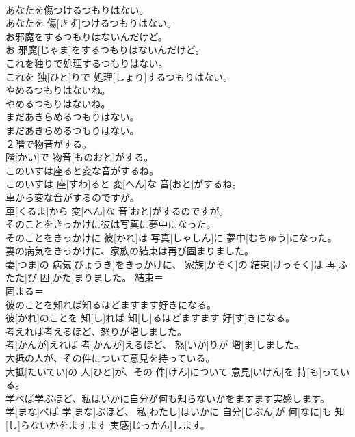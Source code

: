 \documentclass[8pt]{extreport}
\begin{document}
\begin{CJK}{UTF8}{min}
\\	あなたを傷つけるつもりはない。	
\\	あなたを 傷[きず]つけるつもりはない。	
\\	お邪魔をするつもりはないんだけど。	
\\	お 邪魔[じゃま]をするつもりはないんだけど。	
\\	これを独りで処理するつもりはない。	
\\	これを 独[ひと]りで 処理[しょり]するつもりはない。	
\\	やめるつもりはないね。	
\\	やめるつもりはないね。	
\\	まだあきらめるつもりはない。	
\\	まだあきらめるつもりはない。	
\\	２階で物音がする。	
\\	階[かい]で 物音[ものおと]がする。	
\\	このいすは座ると変な音がするね。	
\\	このいすは 座[すわ]ると 変[へん]な 音[おと]がするね。	
\\	車から変な音がするのですが。	
\\	車[くるま]から 変[へん]な 音[おと]がするのですが。	
\\	そのことをきっかけに彼は写真に夢中になった。	
\\	そのことをきっかけに 彼[かれ]は 写真[しゃしん]に 夢中[むちゅう]になった。	
\\	妻の病気をきっかけに、家族の結束は再び固まりました。	
\\	妻[つま]の 病気[びょうき]をきっかけに、 家族[かぞく]の 結束[けっそく]は 再[ふたた]び 固[かた]まりました。	結束＝ 
\\	固まる＝ 
\\	彼のことを知れば知るほどますます好きになる。	
\\	彼[かれ]のことを 知[し]れば 知[し]るほどますます 好[す]きになる。	
\\	考えれば考えるほど、怒りが増しました。	
\\	考[かんが]えれば 考[かんが]えるほど、 怒[いか]りが 増[ま]しました。	
\\	大抵の人が、その件について意見を持っている。	
\\	大抵[たいてい]の 人[ひと]が、その 件[けん]について 意見[いけん]を 持[も]っている。	
\\	学べば学ぶほど、私はいかに自分が何も知らないかをますます実感します。	
\\	学[まな]べば 学[まな]ぶほど、 私[わたし]はいかに 自分[じぶん]が 何[なに]も 知[し]らないかをますます 実感[じっかん]します。	

\end{CJK}
\end{document}
